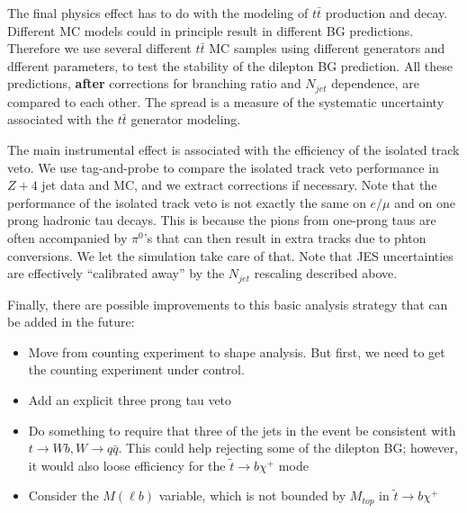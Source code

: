 The final physics effect has to do with the modeling of $t\bar{t}$ production and decay.  Different
MC models could in principle result in different BG predictions.  Therefore we use several different 
$t\bar{t}$ MC samples using different generators and dfferent parameters, to test the stability
of the dilepton BG prediction.  All these predictions, {\bf after} corrections for branching ratio
and $N_{jet}$ dependence, are compared to each other.  The spread is a measure of the systematic
uncertainty associated with the $t\bar{t}$ generator modeling.

The main instrumental effect is associated with the efficiency of the isolated track veto.
We use tag-and-probe to compare the isolated track veto performance in $Z + 4$ jet data and 
MC, and we extract corrections if necessary.  Note that the performance of the isolated track veto 
is not exactly the same on $e/\mu$ and on one prong hadronic tau decays.  This is because
the pions from one-prong taus are often accompanied by $\pi^0$'s that can then result in extra 
tracks due to phton conversions.  We let the simulation take care of that.  
Note that JES uncertainties are effectively ``calibrated away'' by the $N_{jet}$ rescaling described above.  



Finally, there are possible improvements to this basic analysis strategy that can be added in the future:
\begin{itemize}
\item Move from counting experiment to shape analysis.  But first, we need to get the counting
experiment under control.
\item Add an explicit three prong tau veto
\item Do something to require that three of the jets in the event be consistent with $t \to Wb, W \to q\bar{q}$.
This could help rejecting some of the dilepton BG; however, it would also loose efficiency for 
the $\widetilde{t} \to b \chi^+$ mode
\item Consider the $M(\ell b)$ variable, which is not bounded by $M_{top}$ in $\widetilde{t} \to b \chi^+$
\end{itemize}
